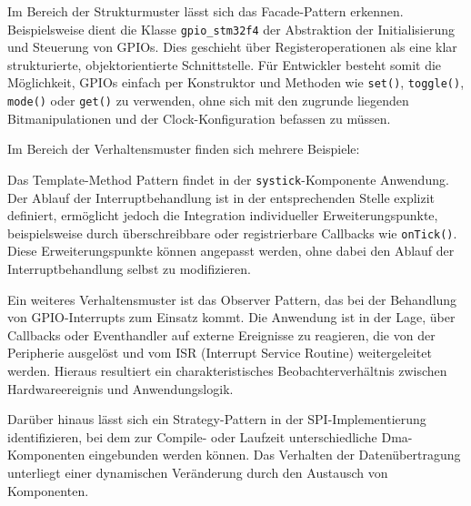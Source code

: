 Im Bereich der Strukturmuster lässt sich das Facade-Pattern erkennen.
Beispielsweise dient die Klasse \texttt{gpio\_stm32f4} der Abstraktion der Initialisierung und Steuerung von GPIOs.
Dies geschieht über Registeroperationen als eine klar strukturierte, objektorientierte Schnittstelle. 
Für Entwickler besteht somit die Möglichkeit, GPIOs einfach per Konstruktor und Methoden wie \texttt{set()}, \texttt{toggle()}, \texttt{mode()} oder \texttt{get()} zu verwenden, ohne sich mit den zugrunde liegenden Bitmanipulationen und der Clock-Konfiguration befassen zu müssen. 

Im Bereich der Verhaltensmuster finden sich mehrere Beispiele:

Das Template-Method Pattern findet in der \texttt{systick}-Komponente Anwendung. 
Der Ablauf der Interruptbehandlung ist in der entsprechenden Stelle explizit definiert, ermöglicht jedoch die Integration individueller Erweiterungspunkte, beispielsweise durch überschreibbare oder registrierbare Callbacks wie \texttt{onTick()}. 
Diese Erweiterungspunkte können angepasst werden, ohne dabei den Ablauf der Interruptbehandlung selbst zu modifizieren.

Ein weiteres Verhaltensmuster ist das Observer Pattern, das bei der Behandlung von GPIO-Interrupts zum Einsatz kommt.
Die Anwendung ist in der Lage, über Callbacks oder Eventhandler auf externe Ereignisse zu reagieren, die von der Peripherie ausgelöst und vom ISR (Interrupt Service Routine) weitergeleitet werden. 
Hieraus resultiert ein charakteristisches Beobachterverhältnis zwischen Hardwareereignis und Anwendungslogik.

Darüber hinaus lässt sich ein Strategy-Pattern in der SPI-Implementierung identifizieren, bei dem zur Compile- oder Laufzeit unterschiedliche Dma-Komponenten eingebunden werden können. 
Das Verhalten der Datenübertragung unterliegt einer dynamischen Veränderung durch den Austausch von Komponenten.
